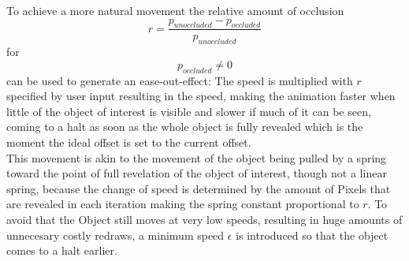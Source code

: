 To achieve a more natural movement the relative amount of occlusion
\begin{equation}
	\label{eq:OcclusionRatio}
	r =\frac{p_{unoccluded} - p_{occluded}}{ p_{unoccluded}}
\end{equation}
for
\begin{equation}
	p_{occluded} \neq 0
\end{equation}
can be used to generate an ease-out-effect:
The speed is multiplied with $r$  specified by user input resulting in the speed, making the animation faster when little of the object of interest is visible and slower if much of it can be seen, coming to a halt as soon as the whole object is fully revealed which is the moment the ideal offset is set to the current offset.\\
This movement is akin to the movement of the object being pulled by a spring toward the point of full revelation of the object of interest, though not a linear spring, because the change of speed is determined by the amount of Pixels that are revealed in each iteration making the spring constant proportional to $r$.
To avoid that the Object still moves at very low speeds, resulting in huge amounts of unnecesary costly redraws, a minimum speed $\epsilon$ is introduced so that the object comes to a halt earlier.\\


